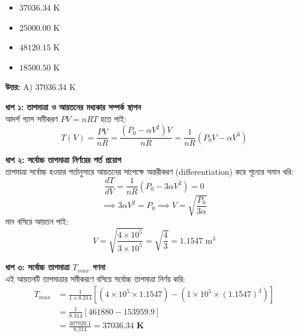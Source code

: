 \documentclass[12pt, a4paper]{article}
\begin{document}
\begin{itemize}[label={}, leftmargin=1cm, itemsep=0.5em]
    \item[\textbf{A)}] $37036.34\text{ K}$
    \item[\textbf{B)}] $25000.00\text{ K}$
    \item[\textbf{C)}] $48120.15\text{ K}$
    \item[\textbf{D)}] $18500.50\text{ K}$
\end{itemize}

\vspace{0.5em}
\begin{tcolorbox}[answerbox]
    \textbf{\color{success} উত্তর:} A) $37036.34\text{ K}$
\end{tcolorbox}
\vspace{1em}

\begin{tcolorbox}[solutionbox={সমাধান (Solution)}]
    \noindent
    \textbf{ধাপ ১: তাপমাত্রা ও আয়তনের মধ্যকার সম্পর্ক স্থাপন} \\
    আদর্শ গ্যাস সমীকরণ $PV = nRT$ হতে পাই:
    \[ T(V) = \frac{P V}{n R} = \frac{(P_0 - \alpha V^2) V}{n R} = \frac{1}{n R} (P_0 V - \alpha V^3) \]
    
    \vspace{0.4em}
    \noindent\textbf{ধাপ ২: সর্বোচ্চ তাপমাত্রা নির্ণয়ের শর্ত প্রয়োগ} \\
    তাপমাত্রা সর্বোচ্চ হওয়ার শর্তানুসারে আয়তনের সাপেক্ষে অন্তরীকরণ (differentiation) করে শূন্যের সমান ধরি:
    \[ \frac{dT}{dV} = \frac{1}{n R} (P_0 - 3 \alpha V^2) = 0 \]
    \[ \implies 3 \alpha V^2 = P_0 \implies V = \sqrt{\frac{P_0}{3 \alpha}} \]
    মান বসিয়ে আয়তন পাই:
    \[ V = \sqrt{\frac{4 \times 10^5}{3 \times 10^5}} = \sqrt{\frac{4}{3}} = 1.1547\text{ m}^3 \]
    
    \vspace{0.4em}
    \noindent\textbf{ধাপ ৩: সর্বোচ্চ তাপমাত্রা $T_{max}$ গণনা} \\
    এই আয়তনটি তাপমাত্রার সমীকরণে বসিয়ে সর্বোচ্চ তাপমাত্রা নির্ণয় করি:
    \begin{align*}
        T_{max} &= \frac{1}{1 \times 8.314} \left[ (4 \times 10^5 \times 1.1547) - (1 \times 10^5 \times (1.1547)^3) \right] \\
        &= \frac{1}{8.314} \left[ 461880 - 153959.9 \right] \\
        &= \frac{307920.1}{8.314} = \mathbf{37036.34\text{ K}}
    \end{align*}
\end{tcolorbox}
\end{document}
